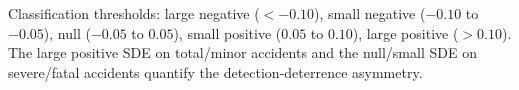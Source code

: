 \documentclass[12pt]{article}
\begin{document}
\begin{table}[H]
{Classification thresholds: large negative ($< -0.10$), small negative ($-0.10$ to $-0.05$), null ($-0.05$ to $0.05$), small positive ($0.05$ to $0.10$), large positive ($> 0.10$). The large positive SDE on total/minor accidents and the null/small SDE on severe/fatal accidents quantify the detection-deterrence asymmetry.}
\end{table}
\end{document}
